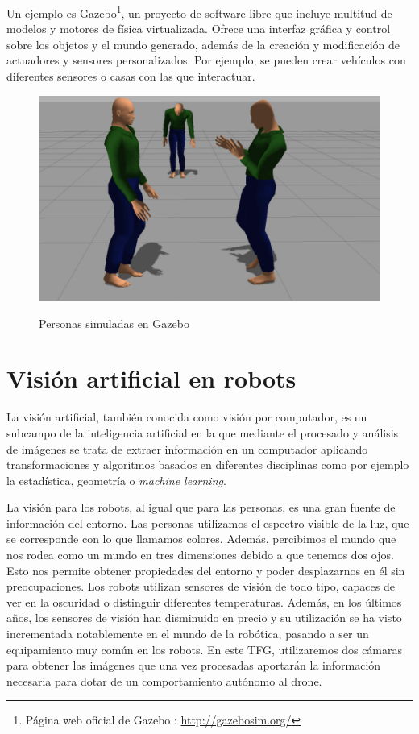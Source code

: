 Un ejemplo es Gazebo\footnote{Página web oficial de Gazebo : \url{http://gazebosim.org/}}, un proyecto de software libre que incluye multitud de modelos y motores de física virtualizada. Ofrece una interfaz gráfica y control sobre los objetos y el mundo generado, además de la creación y modificación de actuadores y sensores personalizados. Por ejemplo, se pueden crear vehículos con diferentes sensores o casas con las que interactuar.

\begin{figure}[hbtp]
	\centering
	{\includegraphics[scale=0.3]{imag/gazebo2.png}}\hspace{10mm}
	\caption{Personas simuladas en Gazebo}
	
	\label{FIG:6_simulacion}
\end{figure}


\section{Visión artificial en robots}\label{SEC:Vision artificial en robots}

La visión artificial, también conocida como visión por computador, es un subcampo de la inteligencia artificial en la que mediante el procesado y análisis de imágenes se trata de extraer información en un computador aplicando transformaciones y algoritmos basados en diferentes disciplinas como por ejemplo la estadística, geometría o \textit{machine learning}.

La visión para los robots, al igual que para las personas, es una gran fuente de información del entorno. Las personas utilizamos el espectro visible de la luz, que se corresponde con lo que llamamos colores. Además, percibimos el mundo que nos rodea como un mundo en tres dimensiones debido a que tenemos dos ojos. Esto nos permite obtener propiedades del entorno y poder  desplazarnos en él sin preocupaciones. Los robots utilizan sensores de visión de todo tipo, capaces de ver en la oscuridad o distinguir diferentes temperaturas. Además, en los últimos años, los sensores de visión han disminuido en precio y su utilización se ha visto incrementada notablemente en el mundo de la robótica, pasando a ser un equipamiento muy común en los robots. En este TFG, utilizaremos dos cámaras para obtener las imágenes que una vez procesadas aportarán la información necesaria para dotar de un comportamiento autónomo al drone.

